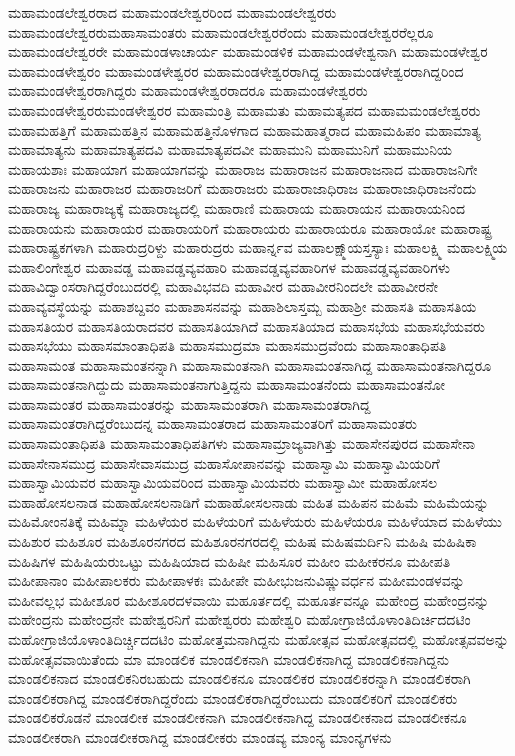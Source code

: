 {ಮಹಾಮಂಡಲೇಶ್ವರರಾದ
ಮಹಾಮಂಡಲೇಶ್ವರರಿಂದ
ಮಹಾಮಂಡಲೇಶ್ವರರು
ಮಹಾಮಂಡಲೇಶ್ವರರುಮಹಾಸಾಮಂತರು
ಮಹಾಮಂಡಲೇಶ್ವರರೆಂದು
ಮಹಾಮಂಡಲೇಶ್ವರರೆಲ್ಲರೂ
ಮಹಾಮಂಡಲೇಶ್ವರರೇ
ಮಹಾಮಂಡಳಾಚಾರ್ಯ
ಮಹಾಮಂಡಳಿಕ
ಮಹಾಮಂಡಳೇಶ್ವನಾಗಿ
ಮಹಾಮಂಡಳೇಶ್ವರ
ಮಹಾಮಂಡಳೇಶ್ವರಂ
ಮಹಾಮಂಡಳೇಶ್ವರರ
ಮಹಾಮಂಡಳೇಶ್ವರರಾಗಿದ್ದ
ಮಹಾಮಂಡಳೇಶ್ವರರಾಗಿದ್ದರಿಂದ
ಮಹಾಮಂಡಳೇಶ್ವರರಾಗಿದ್ದರು
ಮಹಾಮಂಡಳೇಶ್ವರರಾದರೂ
ಮಹಾಮಂಡಳೇಶ್ವರರು
ಮಹಾಮಂಡಳೇಶ್ವರರುಮಂಡಳೇಶ್ವರರ
ಮಹಾಮಂತ್ರಿ
ಮಹಾಮತು
ಮಹಾಮತ್ಯಪದ
ಮಹಾಮಮಂಡಲೇಶ್ವರರು
ಮಹಾಮಹತ್ತಿಗೆ
ಮಹಾಮಹತ್ತಿನ
ಮಹಾಮಹತ್ತಿನೊಳಗಾದ
ಮಹಾಮಹಾತ್ಮರಾದ
ಮಹಾಮಹಿಪಂ
ಮಹಾಮಾತ್ಯ
ಮಹಾಮಾತ್ಯನು
ಮಹಾಮಾತ್ಯಪದವಿ
ಮಹಾಮಾತ್ಯಪದವೀ
ಮಹಾಮುನಿ
ಮಹಾಮುನಿಗೆ
ಮಹಾಮುನಿಯ
ಮಹಾಯಶಾಃ
ಮಹಾಯಾಗ
ಮಹಾಯಾಗವನ್ನು
ಮಹಾರಾಜ
ಮಹಾರಾಜನ
ಮಹಾರಾಜನಾದ
ಮಹಾರಾಜನಿಗೇ
ಮಹಾರಾಜನು
ಮಹಾರಾಜರ
ಮಹಾರಾಜರಿಗೆ
ಮಹಾರಾಜರು
ಮಹಾರಾಜಾಧಿರಾಜ
ಮಹಾರಾಜಾಧಿರಾಜನೆಂದು
ಮಹಾರಾಜ್ಯ
ಮಹಾರಾಜ್ಯಕ್ಕೆ
ಮಹಾರಾಜ್ಯದಲ್ಲಿ
ಮಹಾರಾಣಿ
ಮಹಾರಾಯ
ಮಹಾರಾಯನ
ಮಹಾರಾಯನಿಂದ
ಮಹಾರಾಯನು
ಮಹಾರಾಯರ
ಮಹಾರಾಯರಿಗೆ
ಮಹಾರಾಯರು
ಮಹಾರಾಯರೂ
ಮಹಾರಾಯೋ
ಮಹಾರಾಷ್ಟ್ರ
ಮಹಾರಾಷ್ಟ್ರಕಗಳಾಗಿ
ಮಹಾರುದ್ರರಿಳ್ದು
ಮಹಾರುದ್ರರು
ಮಹಾರ್ನ್ನವ
ಮಹಾಲಕ್ಷ್ಮಾ್ಯಸ್ತಸ್ಯಾಃ
ಮಹಾಲಕ್ಷ್ಮಿ
ಮಹಾಲಕ್ಷ್ಮಿಯ
ಮಹಾಲಿಂಗೇಶ್ವರ
ಮಹಾವಡ್ಡ
ಮಹಾವಡ್ಡವ್ಯವಹಾರಿ
ಮಹಾವಡ್ಡವ್ಯವಹಾರಿಗಳ
ಮಹಾವಡ್ಡವ್ಯವಹಾರಿಗಳು
ಮಹಾವಿದ್ವಾಂಸರಾಗಿದ್ದರೆಂಬುದರಲ್ಲಿ
ಮಹಾವಿಭವದಿ
ಮಹಾವೀರ
ಮಹಾವೀರನಿಂದಲೇ
ಮಹಾವೀರನೇ
ಮಹಾವ್ಯವಸ್ಥೆಯನ್ನು
ಮಹಾಶಬ್ದವಂ
ಮಹಾಶಾಸನವನ್ನು
ಮಹಾಶಿಲಾಸ್ತಮ್ಬ
ಮಹಾಶ್ರೀ
ಮಹಾಸತಿ
ಮಹಾಸತಿಯ
ಮಹಾಸತಿಯರ
ಮಹಾಸತಿಯರಾದವರ
ಮಹಾಸತಿಯಾಗಿದೆ
ಮಹಾಸತಿಯಾದ
ಮಹಾಸಭೆಯ
ಮಹಾಸಭೆಯವರು
ಮಹಾಸಭೆಯು
ಮಹಾಸಮಾಂತಾಧಿಪತಿ
ಮಹಾಸಮುದ್ರಮಾ
ಮಹಾಸಮುದ್ರವೆಂದು
ಮಹಾಸಾಂತಾಧಿಪತಿ
ಮಹಾಸಾಮಂತ
ಮಹಾಸಾಮಂತನನ್ನಾಗಿ
ಮಹಾಸಾಮಂತನಾಗಿ
ಮಹಾಸಾಮಂತನಾಗಿದ್ದ
ಮಹಾಸಾಮಂತನಾಗಿದ್ದರೂ
ಮಹಾಸಾಮಂತನಾಗಿದ್ದುದು
ಮಹಾಸಾಮಂತನಾಗುತ್ತಿದ್ದನು
ಮಹಾಸಾಮಂತನೆಂದು
ಮಹಾಸಾಮಂತನೋ
ಮಹಾಸಾಮಂತರ
ಮಹಾಸಾಮಂತರನ್ನು
ಮಹಾಸಾಮಂತರಾಗಿ
ಮಹಾಸಾಮಂತರಾಗಿದ್ದ
ಮಹಾಸಾಮಂತರಾಗಿದ್ದರೆಂಬುದನ್ನ
ಮಹಾಸಾಮಂತರಾದ
ಮಹಾಸಾಮಂತರಿಗೆ
ಮಹಾಸಾಮಂತರು
ಮಹಾಸಾಮಂತಾಧಿಪತಿ
ಮಹಾಸಾಮಂತಾಧಿಪತಿಗಳು
ಮಹಾಸಾಮ್ರಾಜ್ಯವಾಗಿತ್ತು
ಮಹಾಸೇನಪುರದ
ಮಹಾಸೇನಾ
ಮಹಾಸೇನಾಸಮುದ್ರ
ಮಹಾಸೇವಾಸಮುದ್ರ
ಮಹಾಸೋಪಾನವನ್ನು
ಮಹಾಸ್ವಾಮಿ
ಮಹಾಸ್ವಾಮಿಯರಿಗೆ
ಮಹಾಸ್ವಾಮಿಯವರ
ಮಹಾಸ್ವಾಮಿಯವರಿಂದ
ಮಹಾಸ್ವಾಮಿಯವರು
ಮಹಾಸ್ವಾಮೀ
ಮಹಾಹೋಸಲ
ಮಹಾಹೋಸಲನಾಡ
ಮಹಾಹೋಸಲನಾಡಿಗೆ
ಮಹಾಹೋಸಲನಾಡು
ಮಹಿತ
ಮಹಿಪನ
ಮಹಿಮೆ
ಮಹಿಮೆಯನ್ನು
ಮಹಿಮೋಂನತಿಕ್ಕೆ
ಮಹಿಮ್ನಾ
ಮಹಿಳೆಯರ
ಮಹಿಳೆಯರಿಗೆ
ಮಹಿಳೆಯರು
ಮಹಿಳೆಯರೂ
ಮಹಿಳೆಯಾದ
ಮಹಿಳೆಯು
ಮಹಿಶುರ
ಮಹಿಶೂರ
ಮಹಿಶೂರನಗರದ
ಮಹಿಶೂರನಗರದಲ್ಲಿ
ಮಹಿಷ
ಮಹಿಷಮರ್ದಿನಿ
ಮಹಿಷಿ
ಮಹಿಷಿಕಾ
ಮಹಿಷಿಗಳ
ಮಹಿಷಿಯರುಒಟ್ಟು
ಮಹಿಷಿಯಾದ
ಮಹಿಷೀ
ಮಹಿಸೂರ
ಮಹೀಂ
ಮಹೀಕರನೂ
ಮಹೀಪತಿ
ಮಹೀಪಾನಾಂ
ಮಹೀಪಾಲಕರು
ಮಹೀಪಾಳಕಃ
ಮಹೀಪೇ
ಮಹೀಭುಜನುವಿಷ್ಣುವರ್ಧನ
ಮಹೀಮಂಡಳವನ್ನು
ಮಹೀವಲ್ಲಭ
ಮಹೀಶೂರ
ಮಹೀಶೂರದಳವಾಯಿ
ಮಹೂರ್ತದಲ್ಲಿ
ಮಹೂರ್ತವನ್ನೂ
ಮಹೇಂದ್ರ
ಮಹೇಂದ್ರನನ್ನು
ಮಹೇಂದ್ರನು
ಮಹೇಂದ್ರನೇ
ಮಹೇಶ್ವರನಿಗೆ
ಮಹೇಶ್ವರರು
ಮಹೇಶ್ವರಿ
ಮಹೋಗ್ರಾಜಿಯೊಳಾಂತಿದಿರ್ಚಿದದಟಿಂ
ಮಹೋಗ್ರಾಜಿಯೊಳಾಂತಿದಿರ್ಚ್ಚಿದದಟಿಂ
ಮಹೋತ್ತಮನಾಗಿದ್ದನು
ಮಹೋತ್ಸವ
ಮಹೋತ್ಸವದಲ್ಲಿ
ಮಹೋತ್ಸವವಅನ್ನು
ಮಹೋತ್ಸವವಾಯಿತೆಂದು
ಮಾ
ಮಾಂಡಲಿಕ
ಮಾಂಡಲಿಕನಾಗಿ
ಮಾಂಡಲಿಕನಾಗಿದ್ದ
ಮಾಂಡಲಿಕನಾಗಿದ್ದನು
ಮಾಂಡಲಿಕನಾದ
ಮಾಂಡಲಿಕನಿರಬಹುದು
ಮಾಂಡಲಿಕನೂ
ಮಾಂಡಲಿಕರ
ಮಾಂಡಲಿಕರನ್ನಾಗಿ
ಮಾಂಡಲಿಕರಾಗಿ
ಮಾಂಡಲಿಕರಾಗಿದ್ದ
ಮಾಂಡಲಿಕರಾಗಿದ್ದರೆಂದು
ಮಾಂಡಲಿಕರಾಗಿದ್ದರೆಂಬುದು
ಮಾಂಡಲಿಕರಿಗೆ
ಮಾಂಡಲಿಕರು
ಮಾಂಡಲಿಕರೊಡನೆ
ಮಾಂಡಲೀಕ
ಮಾಂಡಲೀಕನಾಗಿ
ಮಾಂಡಲೀಕನಾಗಿದ್ದ
ಮಾಂಡಲೀಕನಾದ
ಮಾಂಡಲೀಕನೂ
ಮಾಂಡಲೀಕರಾಗಿ
ಮಾಂಡಲೀಕರಾಗಿದ್ದ
ಮಾಂಡಲೀಕರು
ಮಾಂಡವ್ಯ
ಮಾಂನ್ಯ
ಮಾಂನ್ಯಗಳನು
}
